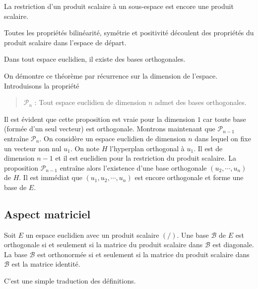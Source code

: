 \begin{prop}
 La restriction d'un produit scalaire à un sous-espace est encore une produit scalaire.
\end{prop}
\begin{demo}
 Toutes les propriétés bilinéarité, symétrie et positivité découlent des propriétés du produit scalaire dans l'espace de départ.
\end{demo}
\clearpage
{}
\begin{thm}
Dans tout espace euclidien, il existe des bases orthogonales.
\end{thm}
\begin{demo}
 On démontre ce théorème par récurrence sur la dimension de l'espace. Introduisons la propriété
\begin{quote}
 $\mathcal{P}_n$ : Tout espace euclidien de dimension $n$ admet des bases orthogonales.
\end{quote}
Il est évident que cette proposition est vraie pour la dimension $1$ car toute base (formée d'un seul vecteur) est orthogonale.\newline
Montrons maintenant que $\mathcal{P}_{n-1}$ entraîne $\mathcal{P}_{n}$.\newline
On considère un espace euclidien de dimension $n$ dans lequel on fixe un vecteur non nul $u_1$. On note $H$ l'hyperplan orthogonal à $u_1$. Il est de dimension $n-1$ et il est euclidien pour la restriction du produit scalaire. La proposition $\mathcal{P}_{n-1}$ entraîne alors l'existence d'une base orthogonale $(u_2,\cdots,u_n)$ de $H$. Il est immédiat que $(u_1,u_2,\cdots,u_n)$ est encore orthogonale et forme une base de $E$.
\end{demo}
\clearpage
\subsection{Aspect matriciel}
\begin{prop}
 Soit $E$ un espace euclidien avec un produit scalaire $(/ )$. Une base $\mathcal B$ de $E$ est orthogonale si et seulement si la matrice du produit scalaire dans $\mathcal B$ est diagonale. La base $\mathcal B$ est orthonormée si et seulement si la matrice du produit scalaire dans $\mathcal B$ est la matrice identité.
\end{prop}
\begin{demo}
  C'est une simple traduction des définitions.
\end{demo}

